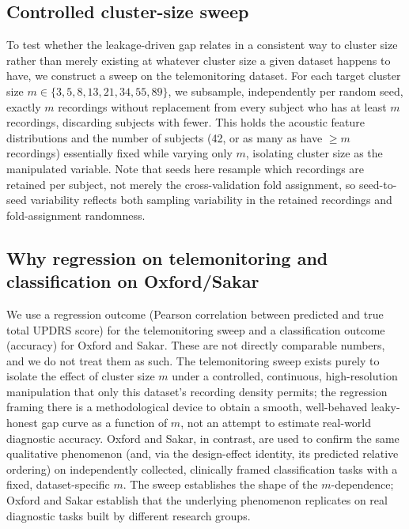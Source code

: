\documentclass[11pt]{article}
\begin{document}
\subsection{Controlled cluster-size sweep}
To test whether the leakage-driven gap relates in a consistent way to cluster size rather than merely existing at whatever cluster size a given dataset happens to have, we construct a sweep on the telemonitoring dataset. For each target cluster size $m \in \{3, 5, 8, 13, 21, 34, 55, 89\}$, we subsample, independently per random seed, exactly $m$ recordings without replacement from every subject who has at least $m$ recordings, discarding subjects with fewer. This holds the acoustic feature distributions and the number of subjects (42, or as many as have $\geq m$ recordings) essentially fixed while varying only $m$, isolating cluster size as the manipulated variable. Note that seeds here resample which recordings are retained per subject, not merely the cross-validation fold assignment, so seed-to-seed variability reflects both sampling variability in the retained recordings and fold-assignment randomness.

\subsection{Why regression on telemonitoring and classification on Oxford/Sakar}
We use a regression outcome (Pearson correlation between predicted and true total UPDRS score) for the telemonitoring sweep and a classification outcome (accuracy) for Oxford and Sakar. These are not directly comparable numbers, and we do not treat them as such. The telemonitoring sweep exists purely to isolate the effect of cluster size $m$ under a controlled, continuous, high-resolution manipulation that only this dataset's recording density permits; the regression framing there is a methodological device to obtain a smooth, well-behaved leaky-honest gap curve as a function of $m$, not an attempt to estimate real-world diagnostic accuracy. Oxford and Sakar, in contrast, are used to confirm the same qualitative phenomenon (and, via the design-effect identity, its predicted relative ordering) on independently collected, clinically framed classification tasks with a fixed, dataset-specific $m$. The sweep establishes the shape of the $m$-dependence; Oxford and Sakar establish that the underlying phenomenon replicates on real diagnostic tasks built by different research groups.
\end{document}

